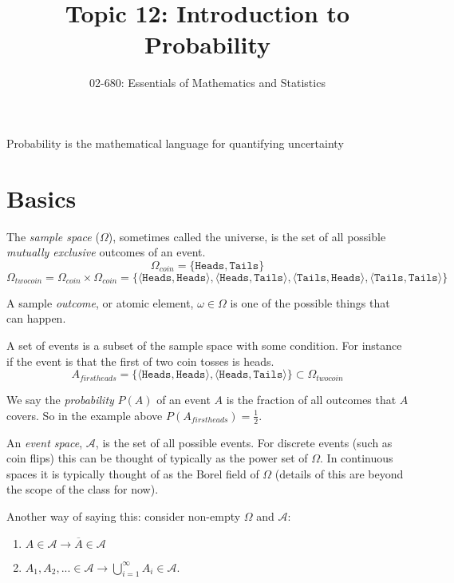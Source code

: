 


\title{Topic 12: Introduction to Probability}
\author{02-680: Essentials of Mathematics and Statistics}


\maketitle

\begin{center}
Probability is the mathematical language for quantifying uncertainty
\end{center} 

\section{Basics}
The \emph{sample space} ($\Omega$), sometimes called the universe, is the set of all possible 
\textit{mutually exclusive} outcomes of an event. 
\[\Omega_{coin}=\{\texttt{Heads},\texttt{Tails}\}\]
\[\Omega_{twocoin}=\Omega_{coin}\times\Omega_{coin}=\{
\langle\texttt{Heads},\texttt{Heads}\rangle,
\langle\texttt{Heads},\texttt{Tails}\rangle,
\langle\texttt{Tails},\texttt{Heads}\rangle,
\langle\texttt{Tails},\texttt{Tails}\rangle\}\]

A sample \emph{outcome}, or atomic element, $\omega\in\Omega$ is one of the possible things that can happen. 

A set of events is a subset of the sample space with some condition. 
For instance if the event is that the first of two coin tosses is heads. 
\[A_{firstheads}=\{
\langle\texttt{Heads},\texttt{Heads}\rangle,
\langle\texttt{Heads},\texttt{Tails}\rangle\} \subset \Omega_{twocoin} \]

We say the \emph{probability} $P(A)$ of an event $A$ is the fraction of all outcomes that $A$ covers. 
So in the example above $P(A_{firstheads})=\frac{1}{2}$.

An \emph{event space}, $\mathcal{A}$, is the set of all possible events. 
For discrete events (such as coin flips) this can be thought of typically as the power set of $\Omega$. 
In continuous spaces it is typically thought of as the Borel field of $\Omega$ (details of this are beyond the scope of the class for now). 

Another way of saying this: 
consider non-empty $\Omega$ and $\mathcal{A}$:
\begin{enumerate}
\item $A\in\mathcal{A} \rightarrow \overline{A}\in\mathcal{A}$
\item $A_1,A_2,... \in \mathcal{A} \rightarrow \bigcup_{i=1}^\infty A_i \in \mathcal{A}$.
\end{enumerate}

